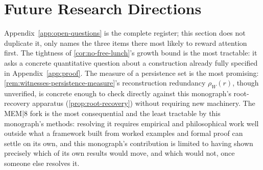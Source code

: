 \section{Future Research Directions}

Appendix~\ref{app:open-questions} is the complete register; this section
does not duplicate it, only names the three items there most likely to
reward attention first. The tightness of \cref{cor:no-free-lunch}'s
growth bound is the most tractable: it asks a concrete quantitative
question about a construction already fully specified in
Appendix~\ref{app:proof}. The measure of a persistence set is the most
promising: \cref{rem:witnesses-persistence-measure}'s reconstruction
redundancy $\rho_W(r)$, though unverified, is concrete enough to check
directly against this monograph's root-recovery apparatus
(\cref{prop:root-recovery}) without requiring new machinery. The MEM|8
fork is the most consequential and the least tractable by this
monograph's methods: resolving it requires empirical and philosophical
work well outside what a framework built from worked examples and
formal proof can settle on its own, and this monograph's contribution is
limited to having shown precisely which of its own results would move,
and which would not, once someone else resolves it.
